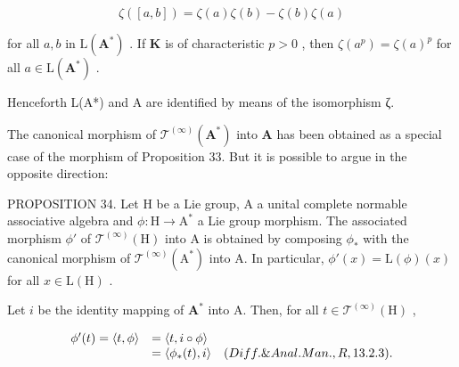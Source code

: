 \[
\zeta ([ a, b ]) = \zeta (a) \zeta (b) - \zeta (b) \zeta (a)
\]

for all \(a, b\) in \(\mathrm{L}(\mathbf{A}^*)\) . If \(\mathbf{K}\) is of characteristic \(p > 0\) , then \(\zeta(a^p) = \zeta(a)^p\) for all \(a \in \mathrm{L}(\mathbf{A}^*)\) .

Henceforth L(A*) and A are identified by means of the isomorphism ζ.

The canonical morphism of \(\mathcal{T}^{(\infty)}(\mathbf{A}^*)\) into \(\mathbf{A}\) has been obtained as a special case of the morphism of Proposition 33. But it is possible to argue in the opposite direction:

PROPOSITION 34. Let H be a Lie group, A a unital complete normable associative algebra and \(\phi: \mathrm{H} \to \mathrm{A}^*\) a Lie group morphism. The associated morphism \(\phi'\) of \(\mathcal{T}^{(\infty)}(\mathrm{H})\) into A is obtained by composing \(\phi_*\) with the canonical morphism of \(\mathcal{T}^{(\infty)}(\mathrm{A}^*)\) into A. In particular, \(\phi'(x) = \mathrm{L}(\phi)(x)\) for all \(x \in \mathrm{L}(\mathrm{H})\) .

Let \(i\) be the identity mapping of \(\mathbf{A}^*\) into A. Then, for all \(t\in \mathcal{T}^{(\infty)}(\mathrm{H})\) ,

\[
\begin{array}{r l} \phi^ {\prime} (t) = \langle t, \phi \rangle & = \langle t, i \circ \phi \rangle \\ & = \langle \phi_ {*} (t), i \rangle \quad (Diff. \& Anal. Man., R, 13.2.3). \end{array}
\]

